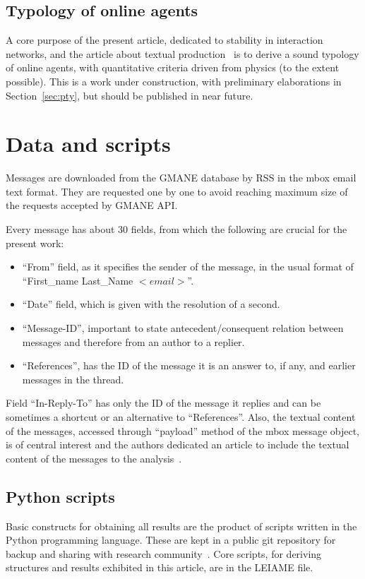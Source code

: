 \documentclass[%
 aip,
 jmp,%
 amsmath,amssymb,
 reprint,%
]{revtex4-1}
\begin{document}
\subsection{Typology of online agents}
A core purpose of the present article, dedicated to stability in interaction networks, and the article about textual production~\cite{rcText} is to derive a sound typology of online agents, with quantitative criteria driven from physics (to the extent possible). This is a work under construction, with preliminary elaborations in Section~\ref{sec:pty}, but should be published in near future.


\section{Data and scripts}\label{scripts}
Messages are downloaded from the GMANE database by RSS in the mbox email text format. 
They are requested one by one to avoid reaching maximum size of the requests accepted by
GMANE API.

Every message has about 30 fields, from which the following are crucial
for the present work:
\begin{itemize}
    \item ``From'' field, as it specifies the sender of the message, in the usual format of ``First\_name Last\_Name $<email>$''.
    \item ``Date'' field, which is given with the resolution of a second.
    \item ``Message-ID'', important to state antecedent/consequent relation between messages and therefore from an author to a replier.
    \item ``References'', has the ID of the message it is an answer to, if any, and earlier messages in the thread.
\end{itemize}

Field ``In-Reply-To'' has only the ID of the message it replies and can be sometimes
a shortcut or an alternative to ``References''. Also, the textual content of the messages,
accessed through ``payload'' method of the mbox message object, is of central interest and
the authors dedicated an article to include the textual content of the messages to the analysis~\cite{rcText}.

\subsection{Python scripts}\label{ap:os}
Basic constructs for obtaining all results are the product of scripts written in the Python programming language. These are kept in a public git repository for backup and sharing with research community~\cite{scriptsFim}. Core scripts, for deriving structures and results exhibited in this article, are in the LEIAME file.
\end{document}
